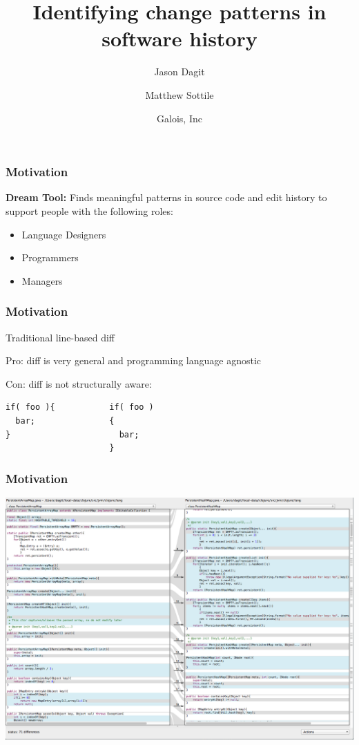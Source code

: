 \documentclass[ignorenonframetext,]{beamer}
\title{Identifying change patterns in software history}
\author{Jason Dagit \and Matthew Sottile}
\date{Galois, Inc}
\begin{document}
\frame{\titlepage}

\begin{frame}\frametitle{Motivation}

\textbf{Dream Tool:} Finds meaningful patterns in source code and edit
history to support people with the following roles:

\begin{itemize}
\item
  Language Designers
\item
  Programmers
\item
  Managers
\end{itemize}

\end{frame}

\begin{frame}[fragile]\frametitle{Motivation}

\begin{block}{Traditional line-based diff}

Pro: diff is very general and programming language agnostic

Con: diff is not structurally aware:

\begin{lstlisting}
if( foo ){           if( foo )
  bar;               {
}                      bar;
                     }
\end{lstlisting}

\end{block}

\end{frame}

\begin{frame}\frametitle{Motivation}

\includegraphics[height=0.8\textheight]{slide-figures/opendiff.png}

\end{frame}
\end{document}
